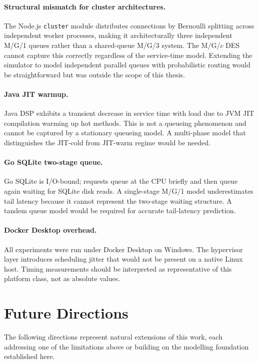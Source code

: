 \paragraph{Structural mismatch for cluster architectures.}
The Node.js \texttt{cluster} module distributes connections by Bernoulli splitting across independent worker processes, making it architecturally three independent M/G/1 queues rather than a shared-queue M/G/3 system. The M/G/$c$ DES cannot capture this correctly regardless of the service-time model. Extending the simulator to model independent parallel queues with probabilistic routing would be straightforward but was outside the scope of this thesis.

\paragraph{Java JIT warmup.}
Java DSP exhibits a transient decrease in service time with load due to JVM JIT compilation warming up hot methods. This is not a queueing phenomenon and cannot be captured by a stationary queueing model. A multi-phase model that distinguishes the JIT-cold from JIT-warm regime would be needed.

\paragraph{Go SQLite two-stage queue.}
Go SQLite is I/O-bound; requests queue at the CPU briefly and then queue again waiting for SQLite disk reads. A single-stage M/G/1 model underestimates tail latency because it cannot represent the two-stage waiting structure. A tandem queue model would be required for accurate tail-latency prediction.

\paragraph{Docker Desktop overhead.}
All experiments were run under Docker Desktop on Windows. The hypervisor layer introduces scheduling jitter that would not be present on a native Linux host. Timing measurements should be interpreted as representative of this platform class, not as absolute values.

\section{Future Directions}

The following directions represent natural extensions of this work, each addressing one of the limitations above or building on the modelling foundation established here.

